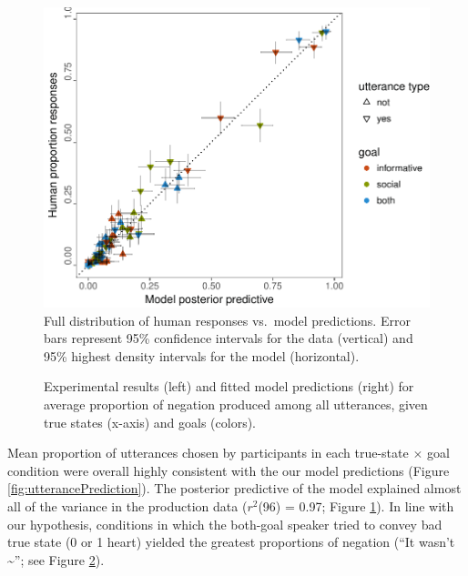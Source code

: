 \documentclass[12pt]{article}
\begin{document}
\begin{figure}
\centering
\includegraphics{politeness_files/figure-latex/varianceExplained-1.pdf}
\caption{\label{fig:varianceExplained}Full distribution of human responses vs.~model predictions. Error bars represent 95\% confidence intervals for the data (vertical) and 95\% highest density intervals for the model (horizontal).}
\end{figure}

\begin{figure}
\centering
\caption{\label{fig:negationPrediction}Experimental results (left) and fitted model predictions (right) for average proportion of negation produced among all utterances, given true states (x-axis) and goals (colors).}
\end{figure}

Mean proportion of utterances chosen by participants in each true-state \(\times\) goal condition were overall highly consistent with the our model predictions (Figure \ref{fig:utterancePrediction}). 
The posterior predictive of the model explained almost all of the variance in the production data (\(r^2\)(96) = 0.97; Figure \ref{fig:varianceExplained}). 
In line with our hypothesis, conditions in which the both-goal speaker tried to convey bad true state (0 or 1 heart) yielded the greatest proportions of negation (\enquote{It wasn't \textasciitilde{}}; see Figure \ref{fig:negationPrediction}).
\end{document}
